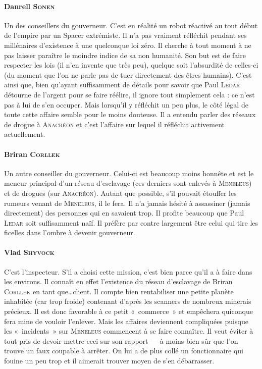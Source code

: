 \documentclass{article}
\begin{document}
{\paragraph{Danrell \textsc{Sonen}}
{
Un des conseillers du gouverneur.
C’est en réalité un robot réactivé au tout début de l’empire par un Spacer extrémiste.
Il n’a pas vraiment réfléchit pendant ses millénaires d’existence à une quelconque loi zéro.
Il cherche à tout moment à ne pas laisser paraître le moindre indice de sa non humanité.
Son but est de faire respecter les lois (il n’en invente que très peu), quelque soit l’absurdité de celles-ci (du moment que l’on ne parle pas de tuer directement des êtres humains).
C’est ainsi que, bien qu’ayant suffisamment de détails pour savoir que Paul \textsc{Ledar} détourne de l’argent pour se faire réélire, il ignore tout simplement cela : ce n’est pas à lui de s’en occuper.
Mais lorsqu’il y réfléchit un peu plus, le côté légal de toute cette affaire semble pour le moins douteuse.
Il a entendu parler des réseaux de drogue à \textsc{Anacréon} et c’est l’affaire sur lequel il réfléchit activement actuellement.
}

\paragraph{Briran \textsc{Corllek}}
{
Un autre conseiller du gouverneur.
Celui-ci est beaucoup moins honnête et est le meneur principal d’un réseau d’esclavage (ces derniers sont enlevés à \textsc{Meneleus}) et de drogues (sur \textsc{Anacréon}).
Autant que possible, s’il pouvait étouffer les rumeurs venant de \textsc{Meneleus}, il le fera.
Il n’a jamais hésité à assassiner (jamais directement) des personnes qui en savaient trop.
Il profite beaucoup que Paul \textsc{Ledar} soit suffisamment naïf.
Il préfère par contre largement être celui qui tire les ficelles dans l’ombre à devenir gouverneur.
}

\paragraph{Vlad \textsc{Shyvock}}
{
C’est l’inspecteur.
S’il a choisi cette mission, c’est bien parce qu’il a à faire dans les environs.
Il connaît en effet l’existence du réseau d’esclavage de Briran \textsc{Corllek} en tant que\ldots client.
Il compte bien rentabiliser une petite planète inhabitée (car trop froide) contenant d’après les scanners de nombreux minerais précieux.
Il est donc favorable à ce petit «~commerce~» et empêchera quiconque fera mine de vouloir l’enlever.
Mais les affaires deviennent compliquées puisque les «~incidents~» sur \textsc{Meneleus} commencent à se faire connaître.
Il veut éviter à tout pris de devoir mettre ceci sur son rapport — à moins bien sûr que l’on trouve un faux coupable à arrêter.
On lui a de plus collé un fonctionnaire qui fouine un peu trop et il aimerait trouver moyen de s’en débarrasser.
}

}
\end{document}
